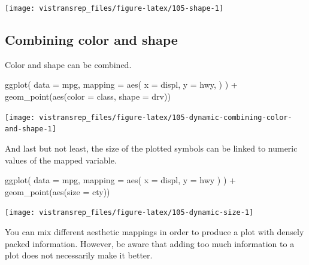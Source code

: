 \documentclass[]{book}
\newenvironment{Shaded}{}{}
\newcommand{\DataTypeTok}[1]{#1}
\newcommand{\KeywordTok}[1]{\textcolor[rgb]{0.00,0.00,1.00}{#1}}
\newcommand{\NormalTok}[1]{#1}
\newcommand{\OperatorTok}[1]{#1}
\newcommand{\StringTok}[1]{\textcolor[rgb]{0.00,0.50,0.50}{#1}}
\begin{document}
\begin{flushright}\texttt{[image: vistransrep\_files/figure-latex/105-shape-1]} \end{flushright}

\hypertarget{combining-color-and-shape}{%
\subsection{Combining color and shape}\label{combining-color-and-shape}}

Color and shape can be combined.

\begin{Shaded}
\begin{Highlighting}[]
\KeywordTok{ggplot}\NormalTok{(}
  \DataTypeTok{data =}\NormalTok{ mpg,}
  \DataTypeTok{mapping =} \KeywordTok{aes}\NormalTok{(}
    \DataTypeTok{x =}\NormalTok{ displ,}
    \DataTypeTok{y =}\NormalTok{ hwy,}
\NormalTok{  )}
\NormalTok{) }\OperatorTok{+}
\StringTok{  }\KeywordTok{geom_point}\NormalTok{(}\KeywordTok{aes}\NormalTok{(}\DataTypeTok{color =}\NormalTok{ class, }\DataTypeTok{shape =}\NormalTok{ drv))}
\end{Highlighting}
\end{Shaded}

\begin{flushright}\texttt{[image: vistransrep\_files/figure-latex/105-dynamic-combining-color-and-shape-1]} \end{flushright}

And last but not least, the size of the plotted symbols can be linked to numeric values of the mapped variable.

\begin{Shaded}
\begin{Highlighting}[]
\KeywordTok{ggplot}\NormalTok{(}
  \DataTypeTok{data =}\NormalTok{ mpg,}
  \DataTypeTok{mapping =} \KeywordTok{aes}\NormalTok{(}
    \DataTypeTok{x =}\NormalTok{ displ,}
    \DataTypeTok{y =}\NormalTok{ hwy}
\NormalTok{  )}
\NormalTok{) }\OperatorTok{+}
\StringTok{  }\KeywordTok{geom_point}\NormalTok{(}\KeywordTok{aes}\NormalTok{(}\DataTypeTok{size =}\NormalTok{ cty))}
\end{Highlighting}
\end{Shaded}

\begin{flushright}\texttt{[image: vistransrep\_files/figure-latex/105-dynamic-size-1]} \end{flushright}

You can mix different aesthetic mappings in order to produce a plot with densely packed information.
However, be aware that adding too much information to a plot does not necessarily make it better.
\end{document}
